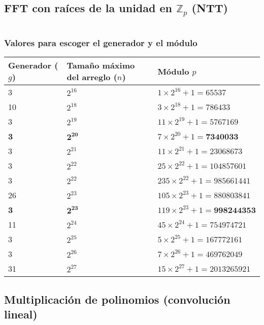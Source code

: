 \documentclass[11pt]{article}
\begin{document}
		\subsection{FFT con raíces de la unidad en $\mathbb{Z}_p$ (NTT)}
		\inputminted[tabsize=2,breaklines,firstline=36,lastline=73,fontsize=\small]{c++}{fft.cpp}
			\subsubsection{Valores para escoger el generador y el módulo}
				\begin{table}[H]
					\centering
					\begin{tabular}{|p{2.3cm}|p{2.7cm}|p{4.5cm}|}
						\hline
						Generador ($g$) & Tamaño máximo del arreglo ($n$) & Módulo $p$ \\ \hline
						3 & $2^{16}$ & $1 \times 2^{16} + 1 = 65537$ \\ \hline
						10 & $2^{18}$ & $3 \times 2^{18} + 1 = 786433$ \\ \hline
						3 & $2^{19}$ & $11 \times 2^{19} + 1 = 5767169$ \\ \hline
						\textbf{3} & $\mathbf{2^{20}}$ & $7 \times 2^{20} + 1 = \textbf{7340033}$ \\ \hline
						3 & $2^{21}$ & $11 \times 2^{21} + 1 = 23068673$ \\ \hline
						3 & $2^{22}$ & $25 \times 2^{22} + 1 = 104857601$ \\ \hline
						3 & $2^{22}$ & $235 \times 2^{22} + 1 = 985661441$ \\ \hline
						26 & $2^{23}$ & $105 \times 2^{23} + 1 = 880803841$ \\ \hline
						\textbf{3} & $\mathbf{2^{23}}$ & $119 \times 2^{23} + 1 = \textbf{998244353}$ \\ \hline
						11 & $2^{24}$ & $45 \times 2^{24} + 1 = 754974721$ \\ \hline
						3 & $2^{25}$ & $5 \times 2^{25} + 1 = 167772161$ \\ \hline
						3 & $2^{26}$ & $7 \times 2^{26} + 1 = 469762049$ \\ \hline
						31 & $2^{27}$ & $15 \times 2^{27} + 1 = 2013265921$ \\ \hline
					\end{tabular}
				\end{table}
			
		\subsection{Multiplicación de polinomios (convolución lineal)}
		\inputminted[tabsize=2,breaklines,firstline=75,lastline=100,fontsize=\small]{c++}{fft.cpp}
		
\end{document}
